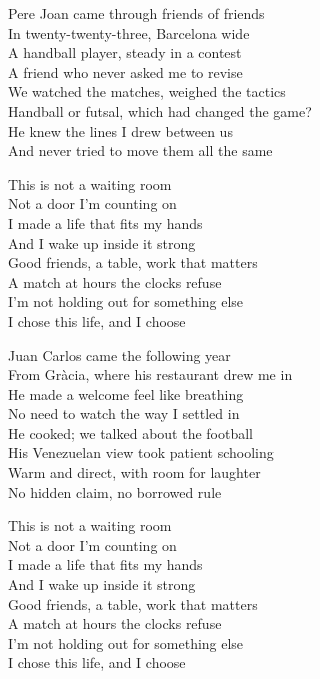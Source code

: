 \begin{lyrics}
Pere Joan came through friends of friends\\
In twenty-twenty-three, Barcelona wide\\
A handball player, steady in a contest\\
A friend who never asked me to revise\\
We watched the matches, weighed the tactics\\
Handball or futsal, which had changed the game?\\
He knew the lines I drew between us\\
And never tried to move them all the same

This is not a waiting room\\
Not a door I'm counting on\\
I made a life that fits my hands\\
And I wake up inside it strong\\
Good friends, a table, work that matters\\
A match at hours the clocks refuse\\
I'm not holding out for something else\\
I chose this life, and I choose

Juan Carlos came the following year\\
From Gràcia, where his restaurant drew me in\\
He made a welcome feel like breathing\\
No need to watch the way I settled in\\
He cooked; we talked about the football\\
His Venezuelan view took patient schooling\\
Warm and direct, with room for laughter\\
No hidden claim, no borrowed rule

This is not a waiting room\\
Not a door I'm counting on\\
I made a life that fits my hands\\
And I wake up inside it strong\\
Good friends, a table, work that matters\\
A match at hours the clocks refuse\\
I'm not holding out for something else\\
I chose this life, and I choose


\end{lyrics}
